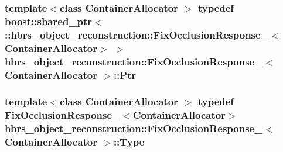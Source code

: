 \hypertarget{structhbrs__object__reconstruction_1_1_fix_occlusion_response___a8b61bcbad4a9d42ae28c679407fa1133}{
\subsubsection[{\-Ptr}]{\setlength{\rightskip}{0pt plus 5cm}template$<$class Container\-Allocator $>$ typedef boost\-::shared\-\_\-ptr$<$ \-::{\bf hbrs\-\_\-object\-\_\-reconstruction\-::\-Fix\-Occlusion\-Response\-\_\-}$<$\-Container\-Allocator$>$ $>$ {\bf hbrs\-\_\-object\-\_\-reconstruction\-::\-Fix\-Occlusion\-Response\-\_\-}$<$ \-Container\-Allocator $>$\-::{\bf \-Ptr}}}\label{structhbrs__object__reconstruction_1_1_fix_occlusion_response___a8b61bcbad4a9d42ae28c679407fa1133}
\hypertarget{structhbrs__object__reconstruction_1_1_fix_occlusion_response___ae5d34c9f3e91b8ac17f7fe21d83977f3}{
\subsubsection[{\-Type}]{\setlength{\rightskip}{0pt plus 5cm}template$<$class Container\-Allocator $>$ typedef {\bf \-Fix\-Occlusion\-Response\-\_\-}$<$\-Container\-Allocator$>$ {\bf hbrs\-\_\-object\-\_\-reconstruction\-::\-Fix\-Occlusion\-Response\-\_\-}$<$ \-Container\-Allocator $>$\-::{\bf \-Type}}}\label{structhbrs__object__reconstruction_1_1_fix_occlusion_response___ae5d34c9f3e91b8ac17f7fe21d83977f3}


